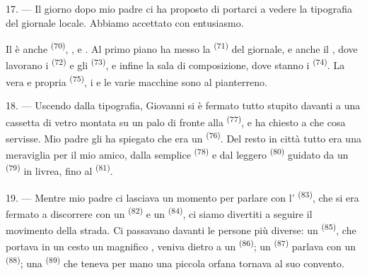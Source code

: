 \VUsaut{3.0mm}

17. --- Il giorno dopo mio padre ci ha proposto di portarci a vedere la tipografia del
giornale locale. Abbiamo accettato con entusiasmo.

Il  è anche  \textsuperscript{(70)},
,  e . Al primo piano ha messo la
 \textsuperscript{(71)} del giornale, e anche il
, dove lavorano i 
\textsuperscript{(72)} e gli  \textsuperscript{(73)}, e
infine la sala di composizione, dove stanno i 
\textsuperscript{(74)}. La vera e propria 
\textsuperscript{(75)}, i  e le varie macchine sono al pianterreno.

\VUsaut{3.0mm}

18. --- Uscendo dalla tipografia, Giovanni si è fermato tutto stupito davanti a una
cassetta di vetro montata su un palo di fronte alla 
\textsuperscript{(77)}, e ha chiesto a che cosa servisse. Mio padre gli ha spiegato che
era un  \textsuperscript{(76)}. Del resto in città tutto
era una meraviglia per il mio amico, dalla semplice 
\textsuperscript{(78)} e dal leggero 
\textsuperscript{(80)} guidato da un  \textsuperscript{(79)} in
livrea, fino al  \textsuperscript{(81)}.

19. --- Mentre mio padre ci lasciava un momento per parlare con l'
\textsuperscript{(83)}, che si era fermato a discorrere con un 
\textsuperscript{(82)} e un  \textsuperscript{(84)}, ci siamo divertiti a
seguire il movimento della strada. Ci passavano davanti le persone più diverse: un
 \textsuperscript{(85)}, che portava in un cesto un
magnifico , veniva dietro a un 
\textsuperscript{(86)}; un  \textsuperscript{(87)} parlava con un
 \textsuperscript{(88)}; una  \textsuperscript{(89)} che
teneva per mano una piccola orfana tornava al suo convento.

\VUsaut{3.0mm}

